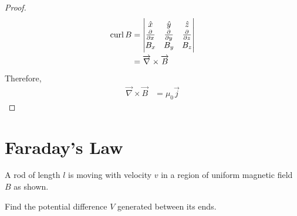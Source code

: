 \documentclass[fleqn, a4paper, 12pt, twoside]{article}
\theoremstyle{definition}
\theoremstyle{theorem}
\newcommand{\curl}{\mathrm{curl\,}}
\begin{document}
\begin{proof}
\begin{align*}
		\curl B &=
			\begin{vmatrix}
				\hat{x}  & \hat{y}  & \hat{z}  \\
				\pd{}{x} & \pd{}{y} & \pd{}{z} \\
				B_x      & B_y      & B_z      \\
			\end{vmatrix}\\
			&= \overrightarrow{\nabla} \times \overrightarrow{B}
	\end{align*}
	Therefore,
	\begin{align*}
		\overrightarrow{\nabla} \times \overrightarrow{B} &= \mu_0 \overrightarrow{j}
	\end{align*}
\end{proof}

\section{Faraday's Law}

\begin{question}
	A rod of length $l$ is moving with velocity $v$ in a region of uniform magnetic field $B$ as shown.
	\begin{figure}[H]
	\end{figure}
	Find the potential difference $V$ generated between its ends.
\end{question}
\end{document}
